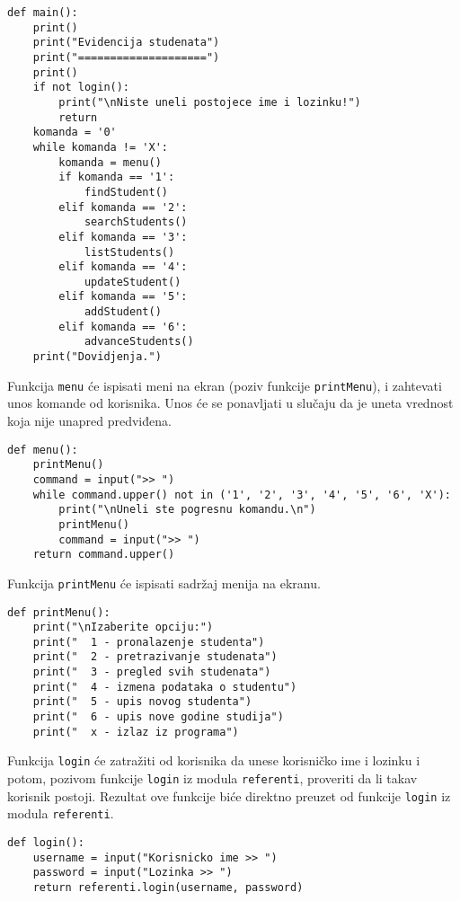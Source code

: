 \documentclass[a4paper]{article}
\begin{document}
\begin{verbatim}
def main():
    print()
    print("Evidencija studenata")
    print("====================")
    print()
    if not login():
        print("\nNiste uneli postojece ime i lozinku!")
        return
    komanda = '0'
    while komanda != 'X':
        komanda = menu()
        if komanda == '1':
            findStudent()
        elif komanda == '2':
            searchStudents()
        elif komanda == '3':
            listStudents()
        elif komanda == '4':
            updateStudent()
        elif komanda == '5':
            addStudent()
        elif komanda == '6':
            advanceStudents()
    print("Dovidjenja.")
\end{verbatim}

Funkcija \texttt{menu} će ispisati meni na ekran (poziv funkcije
\texttt{printMenu}), i zahtevati unos komande od korisnika. Unos će se
ponavljati u slučaju da je uneta vrednost koja nije unapred predviđena.

\begin{verbatim}
def menu():
    printMenu()
    command = input(">> ")
    while command.upper() not in ('1', '2', '3', '4', '5', '6', 'X'):
        print("\nUneli ste pogresnu komandu.\n")
        printMenu()
        command = input(">> ")
    return command.upper()
\end{verbatim}

Funkcija \texttt{printMenu} će ispisati sadržaj menija na ekranu.

\begin{verbatim}
def printMenu():
    print("\nIzaberite opciju:")
    print("  1 - pronalazenje studenta")
    print("  2 - pretrazivanje studenata")
    print("  3 - pregled svih studenata")
    print("  4 - izmena podataka o studentu")
    print("  5 - upis novog studenta")
    print("  6 - upis nove godine studija")
    print("  x - izlaz iz programa")
\end{verbatim}

Funkcija \texttt{login} će zatražiti od korisnika da unese korisničko ime i
lozinku i potom, pozivom funkcije \texttt{login} iz modula \texttt{referenti},
proveriti da li takav korisnik postoji. Rezultat ove funkcije biće direktno
preuzet od funkcije \texttt{login} iz modula \texttt{referenti}.

\begin{verbatim}
def login():
    username = input("Korisnicko ime >> ")
    password = input("Lozinka >> ")
    return referenti.login(username, password)
\end{verbatim}
\end{document}
